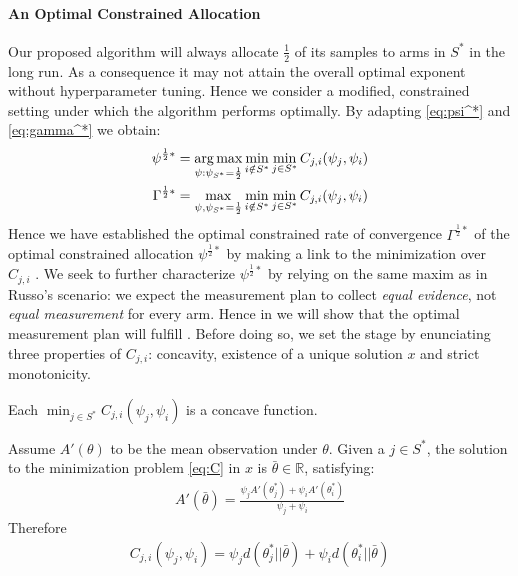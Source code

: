 \paragraph{An Optimal Constrained Allocation}

Our proposed algorithm will always allocate $\frac{1}{2}$ of its samples to arms
in $S^*$ in the long run. As a consequence it may not attain the overall optimal
exponent without hyperparameter tuning. Hence we consider a modified,
constrained setting under which the algorithm performs optimally. By adapting
\eqref{eq:psi^*} and \eqref{eq:gamma^*} we obtain:
\begin{align}
  \psi^{\frac{1}{2}*} &= \operatorname*{arg\,max}_{\psi: \psi_{S^*}=\frac{1}{2}} \min_{i \notin
      S^*}\min_{j \in S^*} C_{j, i}(\psi_j, \psi_i)
      \label{eq:constrained_optimal_psi}\\
  \Gamma^{\frac{1}{2}*} &= \max_{\psi, \psi_{S^*} = \frac{1}{2}} \min_{i \notin
      S^*} \min_{j \in S^*} C_{j, i}(\psi_j, \psi_i)
      \label{eq:constrained_optimal_gamma}
\end{align}
Hence we have established the optimal constrained rate of convergence
$\Gamma^{\frac{1}{2}*}$ of the optimal constrained allocation
$\psi^{\frac{1}{2}*}$ by making a link to the minimization over $C_{j, i}$ . We
seek to further characterize $\psi^{\frac{1}{2}*}$ by relying on the same maxim
as in Russo's scenario: we expect the measurement plan to collect \emph{equal
evidence}, not \emph{equal measurement} for every arm. Hence in
 we will show that the optimal measurement
plan will fulfill . Before doing so, we set the stage by
enunciating three properties of $C_{j, i}$: concavity, existence of a unique
solution $x$ and strict monotonicity.

\begin{lemma}\label{lemma:C_concave}
  Each $\min_{j \in S^*} C_{j, i}(\psi_j, \psi_i)$ is a concave function.
\end{lemma}

\begin{lemma}\label{lemma:C_unique_solution}
  Assume $A'(\theta)$ to be the mean observation under $\theta$. Given a $j \in
  S^*$, the solution to the minimization problem \eqref{eq:C} in $x$ is
  $\bar{\theta} \in \mathbb{R}$, satisfying:
  \begin{align}
    A'(\bar{\theta}) = \frac{\psi_j A'(\theta_j^*) + \psi_i
        A'(\theta_i^*)}{\psi_j + \psi_i}
  \end{align}
  Therefore
  \begin{align}
    C_{j, i}(\psi_j, \psi_i) = \psi_j d(\theta^*_j || \bar{\theta}) + \psi_i
        d(\theta^*_i || \bar{\theta})
  \end{align}
\end{lemma}

